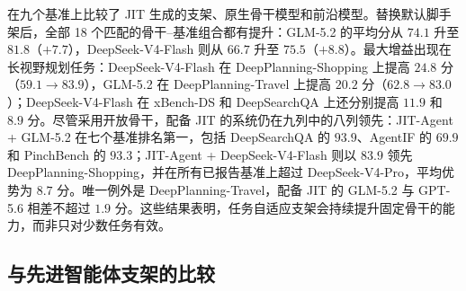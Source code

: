 \documentclass{article}
\newcommand{\ourmethod}{JIT-Agent\xspace}
\begin{document}
 在九个基准上比较了 JIT 生成的支架、原生骨干模型和前沿模型。替换默认脚手架后，全部 18 个匹配的骨干--基准组合都有提升：GLM-5.2 的平均分从 $74.1$ 升至 $81.8$（$+7.7$），DeepSeek-V4-Flash 则从 $66.7$ 升至 $75.5$（$+8.8$）。最大增益出现在长视野规划任务：DeepSeek-V4-Flash 在 DeepPlanning-Shopping 上提高 $24.8$ 分（$59.1\!\rightarrow\!83.9$），GLM-5.2 在 DeepPlanning-Travel 上提高 $20.2$ 分（$62.8\!\rightarrow\!83.0$）；DeepSeek-V4-Flash 在 xBench-DS 和 DeepSearchQA 上还分别提高 $11.9$ 和 $8.9$ 分。尽管采用开放骨干，配备 JIT 的系统仍在九列中的八列领先：\ourmethod{} + GLM-5.2 在七个基准排名第一，包括 DeepSearchQA 的 $93.9$、AgentIF 的 $69.9$ 和 PinchBench 的 $93.3$；\ourmethod{} + DeepSeek-V4-Flash 则以 $83.9$ 领先 DeepPlanning-Shopping，并在所有已报告基准上超过 DeepSeek-V4-Pro，平均优势为 $8.7$ 分。唯一例外是 DeepPlanning-Travel，配备 JIT 的 GLM-5.2 与 GPT-5.6 相差不超过 $1.9$ 分。这些结果表明，任务自适应支架会持续提升固定骨干的能力，而非只对少数任务有效。

\vspace{-0.5em}
\subsection{与先进智能体支架的比较}
\vspace{-0.5em}
\label{sec:advanced_harness_comparison}
\end{document}
